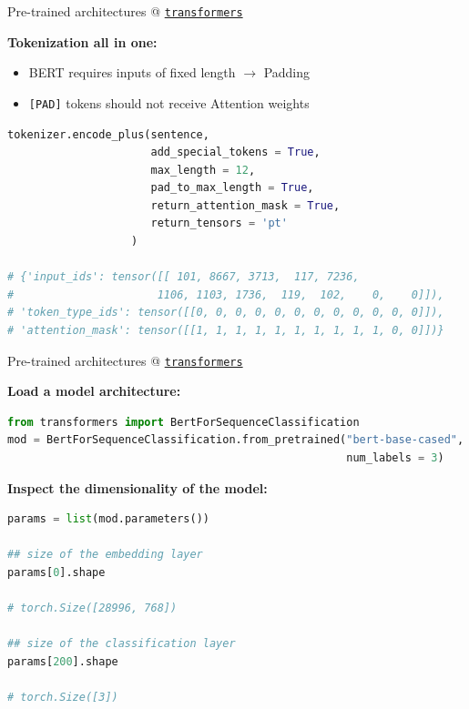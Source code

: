 \documentclass[]{beamer}
\begin{document}
\begin{frame}[fragile]{Pre-trained architectures @ \href{https://github.com/huggingface/transformers}{\texttt{transformers}}}

\textbf{Tokenization all in one:}

\begin{itemize}
		\item BERT requires inputs of fixed length $\rightarrow$ Padding
		\item \texttt{[PAD]} tokens should not receive Attention weights
\end{itemize}
\vspace{-.2cm}
\begin{lstlisting}[language=Python]
tokenizer.encode_plus(sentence, 
                      add_special_tokens = True,
                      max_length = 12,          
                      pad_to_max_length = True,
                      return_attention_mask = True,   
                      return_tensors = 'pt'
                   )
                   
# {'input_ids': tensor([[ 101, 8667, 3713,  117, 7236, 
#                      1106, 1103, 1736,  119,  102,    0,    0]]),
# 'token_type_ids': tensor([[0, 0, 0, 0, 0, 0, 0, 0, 0, 0, 0, 0]]),
# 'attention_mask': tensor([[1, 1, 1, 1, 1, 1, 1, 1, 1, 1, 0, 0]])}
\end{lstlisting}
\end{frame}



\begin{frame}[fragile]{Pre-trained architectures @ \href{https://github.com/huggingface/transformers}{\texttt{transformers}}}

\textbf{Load a model architecture:}
\vspace{-.2cm}
\begin{lstlisting}[language=Python]
from transformers import BertForSequenceClassification
mod = BertForSequenceClassification.from_pretrained("bert-base-cased",
                                                    num_labels = 3)
\end{lstlisting}

\vspace{.3cm}

\textbf{Inspect the dimensionality of the model:}
\vspace{-.2cm}
\begin{lstlisting}[language=Python]
params = list(mod.parameters())

## size of the embedding layer
params[0].shape

# torch.Size([28996, 768])

## size of the classification layer
params[200].shape

# torch.Size([3])
\end{lstlisting}
\end{frame}
\end{document}
